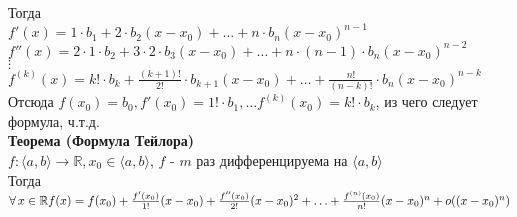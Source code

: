 \documentclass[12pt]{article}
\begin{document}
Тогда\\
$f'(x) = 1\cdot b_1+2\cdot b_2(x-x_0)+\ldots+n\cdot b_n(x-x_0)^{n-1}$\\
$f''(x) = 2\cdot1\cdot b_2+3\cdot2\cdot b_3(x-x_0)+\ldots+n\cdot (n-1)\cdot b_n(x-x_0)^{n-2}$\\
$\vdots$\\
$f^{(k)}(x) = k!\cdot b_k+\frac{(k+1)!}{2!}\cdot b_{k+1}(x-x_0)+\ldots+\frac{n!}{(n-k)!}\cdot b_n(x-x_0)^{n-k}$\\
Отсюда $f(x_0) = b_0, f'(x_0) = 1!\cdot b_1, \ldots f^{(k)}(x_0) = k!\cdot b_k$, из чего следует формула, ч.т.д.\\
\textbf{Теорема (Формула Тейлора)}\\
$f:\langle a, b \rangle \rightarrow \mathbb{R}, x_0\in \langle a, b \rangle$, $f$ - $m$ раз дифференцируема на $\langle a, b \rangle$\\
Тогда $\forall\,x\in\mathbb{R}\\f(x)=f(x_0)+\frac{f'(x_0)}{1!}(x-x_0)+\frac{f''(x_0)}{2!}(x-x_0)^2+\ldots+\frac{f^{(n)}(x_0)}{n!}(x-x_0)^n + o((x-x_0)^n)$\\
\end{document}

